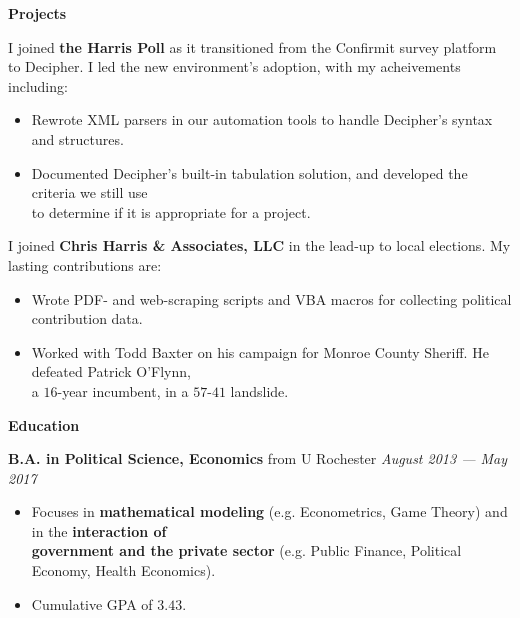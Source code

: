 \documentclass[12pt]{article}
\newenvironment{details}{
\begin{itemize}[label={}]
	\small \setlength{\itemsep}{0pt}
}{\end{itemize}}
\begin{document}
\vspace{.2in}
\large
\textbf{Projects} \hrulefill

\small
\begin{flushleft}
	I joined \textbf{the Harris Poll} as it transitioned from the Confirmit survey platform to Decipher. I led the new environment's adoption, with my acheivements including:
\end{flushleft}
\begin{details}
	\item Rewrote XML parsers in our automation tools to handle Decipher's syntax and structures.
	\item Documented Decipher's built-in tabulation solution, and developed the criteria we still use \\
	\hspace{.1in} to determine if it is appropriate for a project.
\end{details}

\small
\begin{flushleft}
	I joined \textbf{Chris Harris \& Associates, LLC} in the lead-up to local elections. My lasting contributions are:
\end{flushleft}
\begin{details}
	\item Wrote PDF- and web-scraping scripts and VBA macros for collecting political contribution data.
	\item Worked with Todd Baxter on his campaign for Monroe County Sheriff. He defeated Patrick O'Flynn, \\
	\hspace{.1in} a $16$-year incumbent, in a $57$-$41$ landslide.
\end{details}

\vspace{.2in}
\large
\textbf{Education} \hrulefill

\normalsize
\textbf{B.A. in Political Science, Economics} from U Rochester \hfill \textit{August 2013 --- May 2017}
\begin{details}
	\item Focuses in \textbf{mathematical modeling} (e.g. Econometrics, Game Theory) and in the \textbf{interaction of \\
	\hspace{.1in} government and the private sector} (e.g. Public Finance, Political Economy, Health Economics).
	\item Cumulative GPA of $3.43$.
\end{details}
\end{document}
